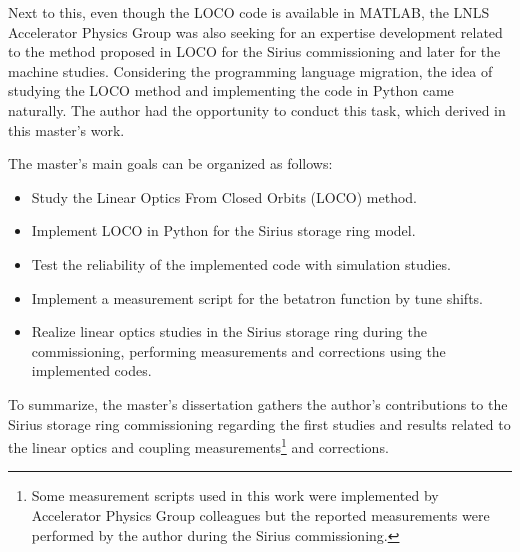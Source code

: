 Next to this, even though the LOCO code is available in MATLAB, the LNLS Accelerator Physics Group was also seeking for an expertise development related to the method proposed in LOCO for the Sirius commissioning and later for the machine studies. Considering the programming language migration, the idea of studying the LOCO method and implementing the code in Python came naturally. The author had the opportunity to conduct this task, which derived in this master's work. 

The master's main goals can be organized as follows:
\begin{itemize}
    \item Study the Linear Optics From Closed Orbits (LOCO) method.
    \item Implement LOCO in Python for the Sirius storage ring model.
    \item Test the reliability of the implemented code with simulation studies.
    \item Implement a measurement script for the betatron function by tune shifts.
    \item Realize linear optics studies in the Sirius storage ring during the commissioning, performing measurements and corrections using the implemented codes.
\end{itemize}

To summarize, the master's dissertation gathers the author's contributions to the Sirius storage ring commissioning regarding the first studies and results related to the linear optics and coupling measurements\footnote{Some measurement scripts used in this work were implemented by Accelerator Physics Group  colleagues but the reported measurements were performed by the author during the Sirius commissioning.} and corrections. 










